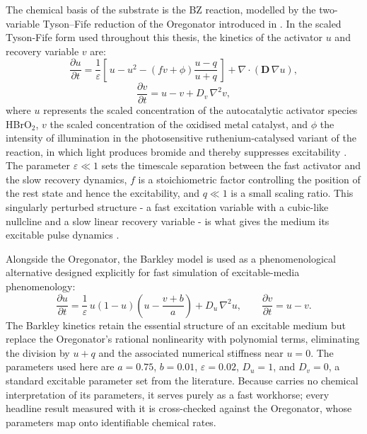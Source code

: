 The chemical basis of the substrate is the BZ reaction, modelled by the two-variable Tyson--Fife reduction of the Oregonator introduced in  \cite{field1974oregonator, tyson1980target}.
In the scaled Tyson-Fife form used throughout this thesis, the kinetics of the activator $u$ and recovery variable $v$ are:
\begin{equation}
\frac{\partial u}{\partial t} = \frac{1}{\varepsilon}\left[\,u - u^{2} - \left(f v + \phi\right)\frac{u - q}{u + q}\,\right] + \nabla\!\cdot\!\left(\mathbf{D}\,\nabla u\right),
\label{eq:oregonator_u}
\end{equation}
\begin{equation}
\frac{\partial v}{\partial t} = u - v + D_{v}\,\nabla^{2} v,
\label{eq:oregonator_v}
\end{equation}
where $u$ represents the scaled concentration of the autocatalytic activator species HBrO$_{2}$, $v$ the scaled concentration of the oxidised metal catalyst, and $\phi$ the intensity of illumination in the photosensitive ruthenium-catalysed variant of the reaction, in which light produces bromide and thereby suppresses excitability \cite{sakurai2002design}.
The parameter $\varepsilon \ll 1$ sets the timescale separation between the fast activator and the slow recovery dynamics, $f$ is a stoichiometric factor controlling the position of the rest state and hence the excitability, and $q \ll 1$ is a small scaling ratio.
This singularly perturbed structure - a fast excitation variable with a cubic-like nullcline and a slow linear recovery variable - is what gives the medium its excitable pulse dynamics \cite{tyson1988singular}.

Alongside the Oregonator, the Barkley model \cite{barkley1991model} is used as a phenomenological alternative designed explicitly for fast simulation of excitable-media phenomenology:
\begin{equation}
\frac{\partial u}{\partial t} = \frac{1}{\varepsilon}\,u\left(1 - u\right)\left(u - \frac{v + b}{a}\right) + D_{u}\,\nabla^{2}u,
\qquad
\frac{\partial v}{\partial t} = u - v.
\label{eq:barkley}
\end{equation}
The Barkley kinetics retain the essential structure of an excitable medium but replace the Oregonator's rational nonlinearity with polynomial terms, eliminating the division by $u + q$ and the associated numerical stiffness near $u = 0$.
The parameters used here are $a = 0.75$, $b = 0.01$, $\varepsilon = 0.02$, $D_{u} = 1$, and $D_{v} = 0$, a standard excitable parameter set from the literature.
Because  carries no chemical interpretation of its parameters, it serves purely as a fast workhorse; every headline result measured with it is cross-checked against the Oregonator, whose parameters map onto identifiable chemical rates.

